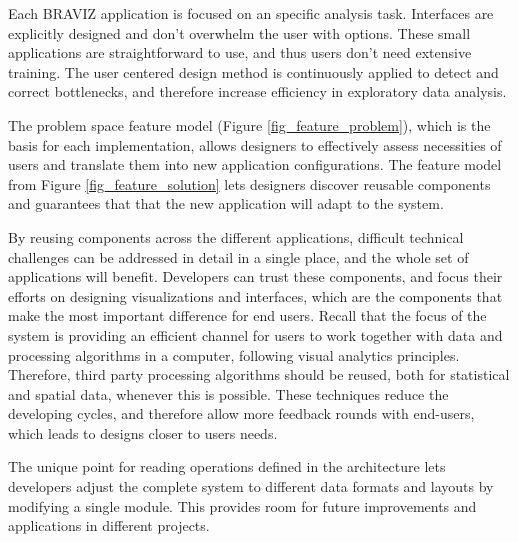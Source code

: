 Each BRAVIZ application is focused on an specific analysis task. Interfaces are explicitly designed and don't overwhelm the user with options. These small applications are straightforward to use, and thus users don't need extensive training. The user centered design method is continuously applied to detect and correct bottlenecks, and therefore increase efficiency in exploratory data analysis. 

The problem space feature model (Figure \ref{fig_feature_problem}), which is the basis for each implementation, allows designers to effectively assess necessities of users and translate them into new application configurations. The feature model from Figure \ref{fig_feature_solution} lets designers discover reusable components and guarantees that that the new application will adapt to the  system. 

By reusing components across the different applications, difficult technical challenges can be addressed in detail in a single place, and the whole set of applications will benefit. Developers can trust these components, and focus their efforts on designing visualizations and interfaces, which are the components that make the most important difference for end users. Recall that the focus of the system is providing an efficient channel for users to work together with data and processing algorithms in a computer, following visual analytics principles. Therefore, third party processing algorithms should be reused, both for statistical and spatial data, whenever this is possible. These techniques reduce the developing cycles, and therefore allow more feedback rounds with end-users, which leads to designs closer to users needs.

The unique point for reading operations defined in the architecture lets developers adjust the complete system to different data formats and layouts by modifying a single module. This provides room for future improvements and applications in different projects. 


